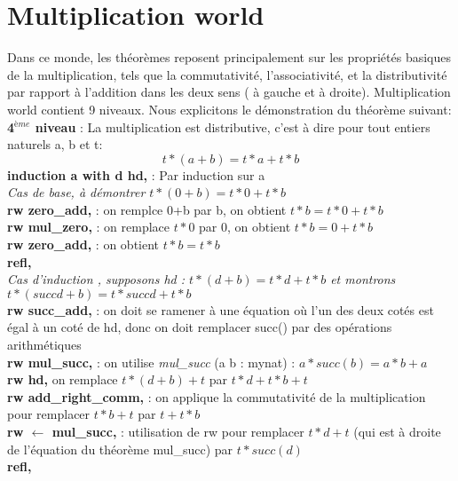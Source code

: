 \section{Multiplication world}
Dans ce monde, les théorèmes reposent principalement sur les propriétés basiques de la multiplication, tels que la commutativité, l'associativité, et la distributivité par rapport à l'addition dans les deux sens ( à gauche et à droite). Multiplication world contient 9 niveaux. Nous explicitons le démonstration du théorème suivant: \\

\textbf{4$^{ème}$ niveau }: La multiplication est distributive, c'est à dire pour tout entiers naturels a, b et t: $$t*(a+b)=t*a+t*b$$
\textbf{induction a with d hd,} : Par induction sur a\\
\textit{Cas de base, à démontrer $t * (0 + b) = t * 0 + t * b$}\\
\textbf{rw zero\_add,} : on remplce 0+b par b, on obtient $t * b = t * 0 + t * b$ \\
\textbf{rw mul\_zero,} : on remplace $t*0$ par 0, on obtient $t * b = 0 + t * b$ \\
\textbf{rw zero\_add,} : on obtient $t * b = t * b$ \\
\textbf{refl,} \\
\textit{Cas d'induction , supposons hd : $t * (d + b) = t * d + t * b$ et montrons $t * (succ d + b) = t * succ d + t * b$ }\\
\textbf{rw succ\_add,} : on doit se ramener à une équation où l'un des deux cotés est égal à un coté de hd, donc on doit remplacer succ() par des opérations arithmétiques\\
\textbf{rw mul\_succ,} : on utilise \textit{mul\_succ} (a b : mynat) : $a * succ(b) = a * b + a $\\
\textbf{rw hd,} on remplace $t * (d + b) + t$ par $t * d + t * b+t$\\
\textbf{rw add\_right\_comm,} : on applique la commutativité de la multiplication pour remplacer $t * b + t$ par $ t + t * b$\\
\textbf{rw $\leftarrow$  mul\_succ, }: utilisation de rw \leftarrow pour remplacer $t * d + t$ (qui est à droite de l'équation du théorème mul\_succ) par $t * succ (d)$ \\
\textbf{refl,} \\

